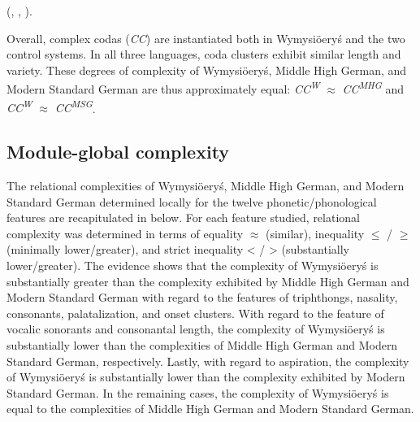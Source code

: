 \documentclass[output=paper,hidelinks]{langscibook}
\begin{document}
(\citealt[260]{wiese_phonology_1996}, \citealt[60]{fox_structure_2005}, \citealt[37]{fagan_german_2009}).

Overall, complex codas (\textit{CC}) are instantiated both in Wymysiöeryś and the two control systems. In all three languages, coda clusters exhibit similar length and variety. These degrees of complexity of Wymysiöeryś, Middle High German, and Modern Standard German are thus approximately equal: \textit{CC\textsuperscript{W}} ${\approx}$ \textit{CC\textsuperscript{MHG}} and \textit{CC\textsuperscript{W}} ${\approx}$ \textit{CC\textsuperscript{MSG}}.

\subsection{Module-global complexity}\label{sec:wymsorys:3.13}

The relational complexities of Wymysiöeryś, Middle High German, and Modern Standard German determined locally for the twelve phonetic/phonological features are recapitulated in  below. For each feature studied, relational complexity was determined in terms of equality ${\approx}$ (similar), inequality ${\leq}$ / ${\geq}$ (minimally lower/greater), and strict inequality < / > (substantially lower/greater). The evidence shows that the complexity of Wymysiöeryś is substantially greater than the complexity exhibited by Middle High German and Modern Standard German with regard to the features of triphthongs, nasality, consonants, palatalization, and onset clusters. With regard to the feature of vocalic sonorants and consonantal length, the complexity of Wymysiöeryś is substantially lower than the complexities of Middle High German and Modern Standard German, respectively. Lastly, with regard to aspiration, the complexity of Wymysiöeryś is substantially lower than the complexity exhibited by Modern Standard German. In the remaining cases, the complexity of Wymysiöeryś is equal to the complexities of Middle High German and Modern Standard German.
\end{document}
